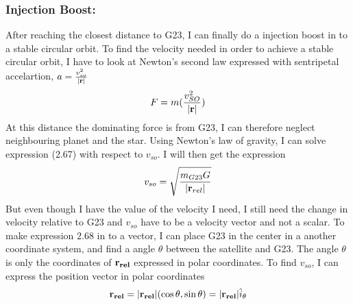 \documentclass[a4paper,11pt,english]{report}
\begin{document}
\subsubsection{Injection Boost:} After reaching the closest distance to G23, I
can finally do a injection boost in to a stable circular orbit. To find the
velocity needed in order to achieve a stable circular orbit, I have to look at
Newton's second law expressed with sentripetal accelartion, \(a =
\frac{v^{2}_{so}}{|\bold{r}|}\)
\begin{align}
  F = m(\frac{v^{2}_{SO}}{|\bold{r}|})
\end{align}
At this distance the dominating force is from G23, I can therefore neglect
neighbouring planet and the star. Using Newton's law of gravity, I can solve
expression (2.67) with respect to \(v_{so}\). I will then get the expression
\begin{align}
  v_{so} = \sqrt{\frac{m_{G23}G}{|\bold{r}_{rel}|}}
\end{align}
But even though I have the value of the velocity I need, I still need the
change in velocity relative to G23
and \(v_{so}\) have to be a velocity vector and not a scalar.
To make expression \(2.68\) in to a vector, I can place G23 in the center in a
another coordinate system, and find a angle \(\theta\) between the satellite
and G23. The angle \(\theta\) is only the coordinates of \(\bold{r_{rel}}\)
expressed in polar coordinates. To find \(v_{so}\), I can express the position
vector in polar coordinates
\begin{align}
  \bold{r_{rel}} = |\bold{r_{rel}}|(\cos{\theta}, \sin{\theta}) = |\bold{r_{rel}}|\hat{i}_{\theta}
\end{align}
\end{document}
